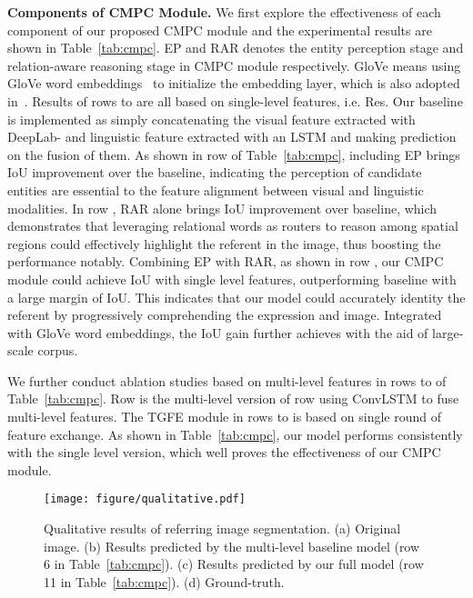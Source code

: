 \documentclass[10pt,twocolumn,letterpaper]{article}
\begin{document}
\textbf{Components of CMPC Module. }We first explore the effectiveness of each component of our proposed CMPC module and the experimental results are shown in Table~\ref{tab:cmpc}.
EP and RAR denotes the entity perception stage and relation-aware reasoning stage in CMPC module respectively. 
GloVe means using GloVe word embeddings~\cite{pennington2014glove} to initialize the embedding layer, 
which is also adopted in~\cite{chen2019see}. 
Results of rows  to  are all based on single-level features, i.e. Res.
Our baseline is implemented as simply concatenating the visual feature extracted with DeepLab- and linguistic feature extracted with an LSTM and making prediction on the fusion of them.
As shown in row  of Table~\ref{tab:cmpc}, including EP brings  IoU improvement over the baseline, indicating the perception of candidate entities are essential to the feature alignment between visual and linguistic modalities.
In row , RAR alone brings  IoU improvement over baseline, which demonstrates that leveraging relational words as routers to reason among spatial regions could effectively highlight the referent in the image, thus boosting the performance notably.
Combining EP with RAR, as shown in row , our CMPC module could achieve  IoU with single level features, outperforming baseline with a large margin of  IoU. 
This indicates that our model could accurately identity the referent by progressively comprehending the expression and image. 
Integrated with GloVe word embeddings, the IoU gain further achieves  with the aid of large-scale corpus.

We further conduct ablation studies based on multi-level features in rows  to  of Table~\ref{tab:cmpc}. 
Row  is the multi-level version of row  using ConvLSTM to fuse multi-level features. 
The TGFE module in rows  to  is based on single round of feature exchange. 
As shown in Table~\ref{tab:cmpc}, our model performs consistently with the single level version, which well proves the effectiveness of our CMPC module.

\begin{figure*}[t]
   \begin{center}
      \texttt{[image: figure/qualitative.pdf]}
   \end{center}
      \caption{Qualitative results of referring image segmentation. (a) Original image. (b) Results predicted by the 
      multi-level baseline model (row 6 in Table~\ref{tab:cmpc}). (c) Results predicted by our full model 
      (row 11 in Table~\ref{tab:cmpc}). (d) Ground-truth.}
   \label{fig:qualitative}
\end{figure*}
\end{document}

